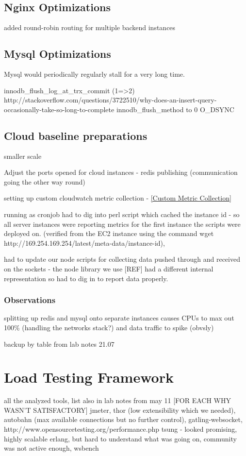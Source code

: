 \documentclass{uvamscse}
\begin{document}
\subsection{Nginx Optimizations}
added round-robin routing for multiple backend instances

\subsection{Mysql Optimizations}
Mysql would periodically regularly stall for a very long time.

innodb\_flush\_log\_at\_trx\_commit (1=>2)
http://stackoverflow.com/questions/3722510/why-does-an-insert-query-occasionally-take-so-long-to-complete
innodb\_flush\_method to 0 O\_DSYNC


\subsection{Cloud baseline preparations}

smaller scale

Adjust the ports opened for cloud instances - redis publishing (communication going the other way round)

setting up custom cloudwatch metric collection - \ref{Custom Metric Collection}

running as cronjob
had to dig into perl script which cached the instance id - so all server instances were reporting metrics for the first instance the scripts were deployed on. (verified from the EC2 instance using the command wget http://169.254.169.254/latest/meta-data/instance-id),

had to update our node scripts for collecting data pushed through and received on the sockets - the node library we use [REF] had a different internal representation so had to dig in to report data properly.

\subsubsection{Observations}

splitting up redis and mysql onto separate instances causes CPUs to max out 100\% (handling the networks stack?) and data traffic to spike (obvsly)

backup by table from lab notes 21.07

\section{Load Testing Framework}\label{Load Testing Framework}
all the analyzed tools, list also in lab notes from may 11 [FOR EACH WHY WASN'T SATISFACTORY]
jmeter, thor (low extensibility which we needed), autobahn (max available connections but no further control),
gatling-websocket, http://www.opensourcetesting.org/performance.php
tsung - looked promising, highly scalable erlang, but hard to understand what was going on, community was not active enough, wsbench
\end{document}
